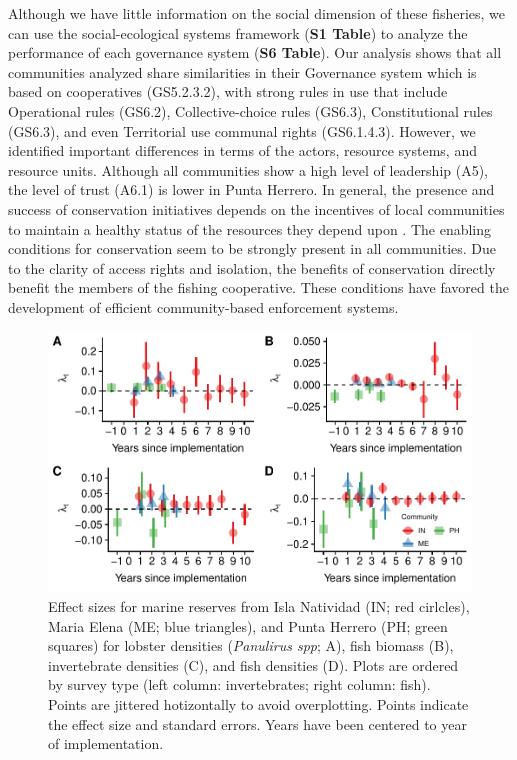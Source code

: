 \documentclass{frontiersSCNS}
\theoremstyle{definition}
\theoremstyle{definition}
\theoremstyle{definition}
\theoremstyle{remark}
\begin{document}
Although we have little information on the social dimension of these
fisheries, we can use the social-ecological systems framework
(\textbf{S1 Table}) to analyze the performance of each governance system
(\textbf{S6 Table}). Our analysis shows that all communities analyzed
share similarities in their Governance system which is based on
cooperatives (GS5.2.3.2), with strong rules in use that include
Operational rules (GS6.2), Collective-choice rules (GS6.3),
Constitutional rules (GS6.3), and even Territorial use communal rights
(GS6.1.4.3). However, we identified important differences in terms of
the actors, resource systems, and resource units. Although all
communities show a high level of leadership (A5), the level of trust
(A6.1) is lower in Punta Herrero. In general, the presence and success
of conservation initiatives depends on the incentives of local
communities to maintain a healthy status of the resources they depend
upon \citep{jupiter_2017}. The enabling conditions for conservation seem
to be strongly present in all communities. Due to the clarity of access
rights and isolation, the benefits of conservation directly benefit the
members of the fishing cooperative. These conditions have favored the
development of efficient community-based enforcement systems.

\clearpage

\begin{figure}
\centering
\includegraphics{Villasenor-Derbez_files/figure-latex/unnamed-chunk-4-1.pdf}
\caption{\label{fig:unnamed-chunk-4}\label{fig:indicators}Effect sizes for
marine reserves from Isla Natividad (IN; red cirlcles), Maria Elena (ME;
blue triangles), and Punta Herrero (PH; green squares) for lobster
densities (\emph{Panulirus spp}; A), fish biomass (B), invertebrate
densities (C), and fish densities (D). Plots are ordered by survey type
(left column: invertebrates; right column: fish). Points are jittered
hotizontally to avoid overplotting. Points indicate the effect size and
standard errors. Years have been centered to year of implementation.}
\end{figure}
\end{document}
